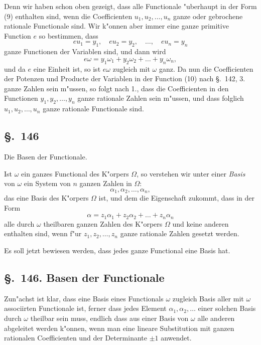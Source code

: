 \documentclass[12pt,a4paper]{article}
\theoremstyle{definition}
\begin{document}
Denn wir haben schon oben gezeigt, dass alle Functionale "uberhaupt in der Form (9) enthalten sind, wenn die Coefficienten $u_1, u_2, \dots, u_n$ ganze oder gebrochene rationale Functionale sind. Wir k"onnen aber immer eine ganze primitive Function $e$ so bestimmen, dass
\begin{equation}
eu_1 = y_1, \quad eu_2 = y_2, \quad \dots, \quad eu_n = y_n
\end{equation}
ganze Functionen der Variablen sind, und dann wird
\begin{equation}
e\omega = y_1\omega_1 + y_2\omega_2 + \dots + y_n\omega_n,
\end{equation}
und da $e$ eine Einheit ist, so ist $e\omega$ zugleich mit $\omega$ ganz. Da nun die Coefficienten der Potenzen und Producte der Variablen in der Function (10) nach \S.~142, 3. ganze Zahlen sein m"ussen, so folgt nach 1., dass die Coefficienten in den Functionen $y_1, y_2, \dots, y_n$ ganze rationale Zahlen sein m"ussen, und dass folglich $u_1, u_2, \dots, u_n$ ganze rationale Functionale sind.


\subsection*{\S.~146}

Die Basen der Functionale.

Ist $\omega$ ein ganzes Functional des K"orpers $\Omega$, so verstehen wir unter einer \emph{Basis} von $\omega$ ein System von $n$ ganzen Zahlen in $\Omega$:
\begin{equation}
\alpha_1, \alpha_2, \dots, \alpha_n,
\end{equation}
das eine Basis des K"orpers $\Omega$ ist, und dem die Eigenschaft zukommt, dass in der Form
\begin{equation}
\alpha = z_1\alpha_1 + z_2\alpha_2 + \dots + z_n\alpha_n
\end{equation}
alle durch $\omega$ theilbaren ganzen Zahlen des K"orpers $\Omega$ und keine anderen enthalten sind, wenn f"ur $z_1, z_2, \dots, z_n$ ganze rationale Zahlen gesetzt werden.

Es soll jetzt bewiesen werden, dass jedes ganze Functional eine Basis hat.

\subsection*{\S.~146. Basen der Functionale}

Zun"achst ist klar, dass eine Basis eines Functionals $\omega$ zugleich Basis aller mit $\omega$ associirten Functionale ist, ferner dass jedes Element $\alpha_1, \alpha_2, \dots$ einer solchen Basis durch $\omega$ theilbar sein muss, endlich dass aus einer Basis von $\omega$ alle anderen abgeleitet werden k"onnen, wenn man eine lineare Substitution mit ganzen rationalen Coefficienten und der Determinante $\pm 1$ anwendet.
\end{document}
